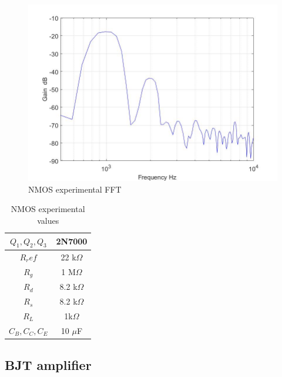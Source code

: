 \begin{figure}[H]
	\centering
	\includegraphics[width=0.7\linewidth]{ExperimentalImplementation/nmos_fft.jpg}
	\caption{NMOS experimental FFT}
	\label{fig:nmosfft}
\end{figure}




\begin{table}[H]
	\centering
	\caption{NMOS experimental values}
	\label{tab:nmosexp}
	\begin{tabular}{cc}
		$Q_1, Q_2, Q_3$ & 2N7000        \\ \hline
		$R_ref$         & 22 k$\Omega$ \\ \hline
		$R_g$           & 1 M$\Omega$  \\ \hline
		$R_d$           & 8.2 k$\Omega$   \\ \hline
		$R_s$           & 8.2 k$\Omega$  \\ \hline
		$R_L$           & 1k$\Omega$    \\ \hline
		$C_B, C_C, C_E$ & 10 $\mu$F         \\ \hline   
	\end{tabular}
\end{table}



\subsection{BJT amplifier}


